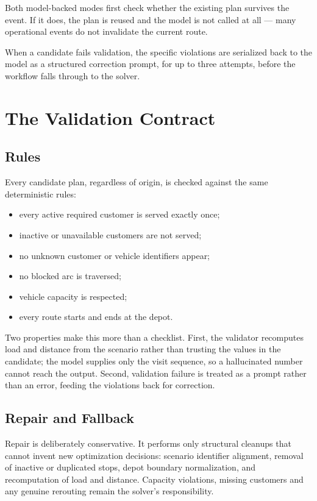 \documentclass[11pt,a4paper]{article}
\begin{document}
Both model-backed modes first check whether the existing plan survives the event. If it does, the
plan is reused and the model is not called at all --- many operational events do not invalidate the
current route.

When a candidate fails validation, the specific violations are serialized back to the model as a
structured correction prompt, for up to three attempts, before the workflow falls through to the
solver.

\section{The Validation Contract}

\subsection{Rules}

Every candidate plan, regardless of origin, is checked against the same deterministic rules:

\begin{itemize}
  \item every active required customer is served exactly once;
  \item inactive or unavailable customers are not served;
  \item no unknown customer or vehicle identifiers appear;
  \item no blocked arc is traversed;
  \item vehicle capacity is respected;
  \item every route starts and ends at the depot.
\end{itemize}

Two properties make this more than a checklist. First, the validator recomputes load and distance
from the scenario rather than trusting the values in the candidate; the model supplies only the
visit sequence, so a hallucinated number cannot reach the output. Second, validation failure is
treated as a prompt rather than an error, feeding the violations back for correction.

\subsection{Repair and Fallback}

Repair is deliberately conservative. It performs only structural cleanups that cannot invent new
optimization decisions: scenario identifier alignment, removal of inactive or duplicated stops,
depot boundary normalization, and recomputation of load and distance. Capacity violations, missing
customers and any genuine rerouting remain the solver's responsibility.
\end{document}
